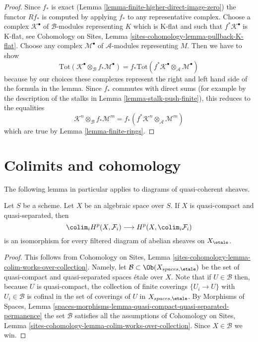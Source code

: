\begin{proof}
Since $f_*$ is exact (Lemma \ref{lemma-finite-higher-direct-image-zero})
the functor $Rf_*$ is computed by applying $f_*$ to any representative complex.
Choose a complex $\mathcal{K}^\bullet$ of $\mathcal{B}$-modules
representing $K$ which is K-flat and such that $f^*\mathcal{K}^\bullet$
is K-flat, see Cohomology on Sites, Lemma
\ref{sites-cohomology-lemma-pullback-K-flat}.
Choose any complex $\mathcal{M}^\bullet$ of $\mathcal{A}$-modules
representing $M$. Then
we have to show
$$
\text{Tot}(\mathcal{K}^\bullet \otimes_\mathcal{B} f_*\mathcal{M}^\bullet)
=
f_*\text{Tot}(f^*\mathcal{K}^\bullet \otimes_\mathcal{A} \mathcal{M}^\bullet)
$$
because by our choices these complexes represent the right and left hand
side of the formula in the lemma.
Since $f_*$ commutes with direct sums
(for example by the description of the stalks in
Lemma \ref{lemma-stalk-push-finite}),
this reduces to the equalities
$$
\mathcal{K}^n \otimes_\mathcal{B} f_*\mathcal{M}^m
=
f_*(f^*\mathcal{K}^n \otimes_\mathcal{A} \mathcal{M}^m)
$$
which are true by Lemma \ref{lemma-finite-rings}.
\end{proof}









\section{Colimits and cohomology}
\label{section-colimits}

\noindent
The following lemma in particular applies to diagrams of quasi-coherent
sheaves.

\begin{lemma}
\label{lemma-colimits}
Let $S$ be a scheme. Let $X$ be an algebraic space over $S$.
If $X$ is quasi-compact and quasi-separated, then
$$
\colim_i H^p(X, \mathcal{F}_i)
\longrightarrow
H^p(X, \colim_i \mathcal{F}_i)
$$
is an isomorphism
for every filtered diagram of abelian sheaves on $X_\etale$.
\end{lemma}

\begin{proof}
This follows from
Cohomology on Sites, Lemma
\ref{sites-cohomology-lemma-colim-works-over-collection}.
Namely, let $\mathcal{B} \subset \Ob(X_{spaces, \etale})$
be the set of quasi-compact and quasi-separated spaces \'etale over $X$.
Note that if $U \in \mathcal{B}$ then, because $U$ is quasi-compact,
the collection of finite coverings $\{U_i \to U\}$ with $U_i \in \mathcal{B}$
is cofinal in the set of coverings of $U$ in $X_{spaces, \etale}$. By
Morphisms of Spaces, Lemma
\ref{spaces-morphisms-lemma-quasi-compact-quasi-separated-permanence}
the set $\mathcal{B}$ satisfies all the assumptions of
Cohomology on Sites, Lemma
\ref{sites-cohomology-lemma-colim-works-over-collection}.
Since $X \in \mathcal{B}$ we win.
\end{proof}

